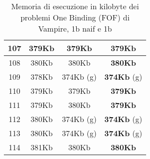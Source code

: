 \begin{table}[H]
\begin{minipage}{5cm}
{\begin{tabular}{|c|c|c|c|}
\hline
107 & 379Kb & 379Kb & \textbf{379Kb} \\
\hline
108 & 380Kb & 380Kb & \textbf{380Kb} \\
\hline
109 & 378Kb & 374Kb (g) & \textbf{374Kb} (g) \\
\hline
110 & 379Kb & 379Kb & \textbf{379Kb} \\
\hline
111 & 379Kb & 380Kb & \textbf{379Kb} \\
\hline
112 & 380Kb & 374Kb (g) & \textbf{374Kb} (g) \\
\hline
113 & 380Kb & 374Kb (g) & \textbf{374Kb} (g) \\
\hline
114 & 381Kb & 380Kb & \textbf{380Kb} \\
\hline
\end{tabular}
}
\end{minipage}
\caption{Memoria di esecuzione in kilobyte dei problemi One Binding (FOF) di Vampire, 1b naif e 1b}
\end{table}
